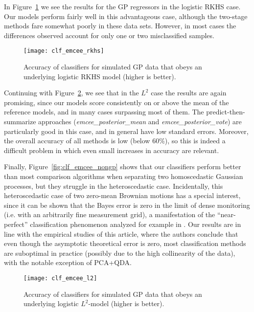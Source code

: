 In Figure~\ref{fig:clf_emcee_rkhs} we see the results for the GP regressors in the logistic RKHS case. Our models perform fairly well in this advantageous case, although the two-stage methods fare somewhat poorly in these data sets. However, in most cases the differences observed account for only one or two misclassified samples.

\begin{figure}[ht!]
  \centering
  \texttt{[image: clf\_emcee\_rkhs]}
  \caption{Accuracy of classifiers for simulated GP data that obeys an underlying logistic RKHS model (higher is better).}\label{fig:clf_emcee_rkhs}
\end{figure}

Continuing with Figure~\ref{fig:clf_emcee_l2}, we see that in the \(L^2\) case the results are again promising, since our models score consistently on or above the mean of the reference models, and in many cases surpassing most of them. The predict-then-summarize approaches (\textit{emcee\_posterior\_mean} and \textit{emcee\_posterior\_vote}) are particularly good in this case, and in general have low standard errors. Moreover, the overall accuracy of all methods is low (below 60\%), so this is indeed a difficult problem in which even small increases in accuracy are relevant.

Finally, Figure~\ref{fig:clf_emcee_nongp} shows that our classifiers perform better than most comparison algorithms when separating two homoscedastic Gaussian processes, but they struggle in the heteroscedastic case. Incidentally, this heteroscedastic case of two zero-mean Brownian motions has a special interest, since it can be shown that the Bayes error is zero in the limit of dense monitoring (i.e. with an arbitrarily fine measurement grid), a manifestation of the ``near-perfect'' classification phenomenon analyzed for example in \citet{torrecilla2020optimal}. Our results are in line with the empirical studies of this article, where the authors conclude that even though the asymptotic theoretical error is zero, most classification methods are suboptimal in practice (possibly due to the high collinearity of the data), with the notable exception of PCA+QDA.

\begin{figure}[htbp!]
  \centering
  \texttt{[image: clf\_emcee\_l2]}
  \caption{Accuracy of classifiers for simulated GP data that obeys an underlying logistic \(L^2\)-model (higher is better).}\label{fig:clf_emcee_l2}
\end{figure}

